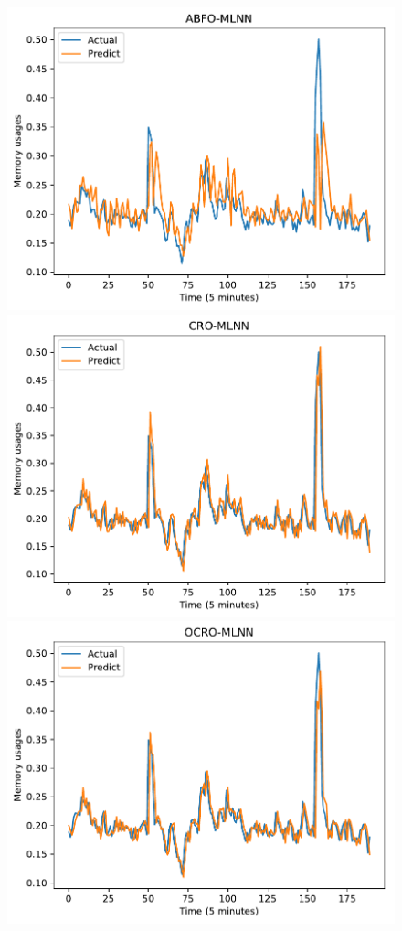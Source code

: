 \documentclass[11pt,twoside]{article}
\begin{document}
\begin{multicols}{2}
\begin{figure}[!ht]
    \begin{minipage}[b]{0.33\linewidth}
    \centering
    \includegraphics[width=0.9\linewidth]{images/pdf/predict/k5/ram_k5_abfo_mlnn.pdf} 
  \end{minipage}
  \begin{minipage}[b]{0.33\linewidth}
    \centering
    \includegraphics[width=0.9\linewidth]{images/pdf/predict/k5/ram_k5_cro_mlnn.pdf} 
  \end{minipage} 
  \begin{minipage}[b]{0.33\linewidth}
    \centering
    \includegraphics[width=0.9\linewidth]{images/pdf/predict/k5/ram_k5_ocro_mlnn.pdf} 

\end{minipage}
\end{figure}
\end{multicols}
\end{document}
